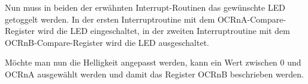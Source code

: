 Nun muss in beiden der erwähnten Interrupt-Routinen das gewünschte LED getoggelt werden. In der ersten Interruptroutine mit dem OCRnA-Compare-Register wird die LED eingeschaltet, in der zweiten Interruptroutine mit dem OCRnB-Compare-Register wird die LED ausgeschaltet.

Möchte man nun die Helligkeit angepasst werden, kann ein Wert zwischen 0 und OCRnA ausgewählt werden und damit das Register OCRnB beschrieben werden.

%
%
%
%
%
%

